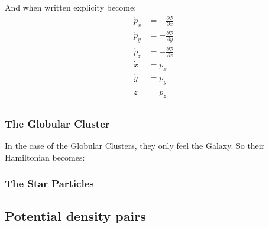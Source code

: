         And when written explicity become: 
        \begin{align}
            \dot{p}_x &= -\frac{\partial \Phi}{\partial x} \\
            \dot{p}_y &= -\frac{\partial \Phi}{\partial y} \\
            \dot{p}_z &= -\frac{\partial \Phi}{\partial z} \\
            \dot{x} &= p_x \\ 
            \dot{y} &= p_y \\ 
            \dot{z} &= p_z \\ 
        \end{align}        


        \subsubsection*{The Globular Cluster}
            In the case of the Globular Clusters, they only feel the Galaxy. So their Hamiltonian becomes: 


        \subsubsection*{The Star Particles}

    \subsection{Potential density pairs}

